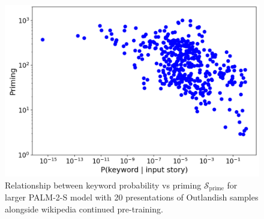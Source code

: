 \documentclass[11pt, a4paper, logo, copyright]{googledeepmind}
\theoremstyle{plain}
\theoremstyle{definition}
\theoremstyle{remark}
\begin{document}
\begin{figure}[h]
\vspace{0mm}
    \centering \includegraphics[scale=.2,clip]{figures/Reviewer_Wiki20.png}
    \vspace{-1mm}
    \caption{Relationship between keyword probability vs priming $\mathcal{S}_\text{prime}$ for larger PALM-2-S model with 20 presentations of Outlandish samples alongside wikipedia continued pre-training. } \label{fig:Reviewer_Wiki20}
  \vspace{-0mm}
\end{figure}
\end{document}
